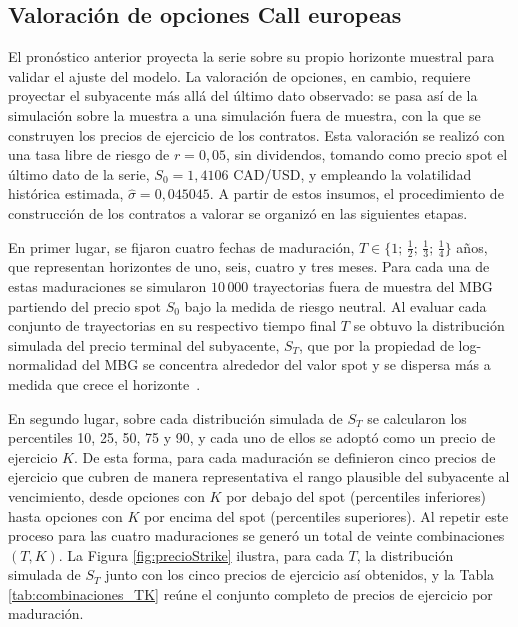 \documentclass{article}
\begin{document}
\subsection*{Valoración de opciones Call europeas}
El pronóstico anterior proyecta la serie sobre su propio horizonte muestral para validar el ajuste del modelo. La valoración de opciones, en cambio, requiere proyectar el subyacente más allá del último dato observado: se pasa así de la simulación sobre la muestra a una simulación fuera de muestra, con la que se construyen los precios de ejercicio de los contratos. Esta valoración se realizó con una tasa libre de riesgo de $r=0{,}05$, sin dividendos, tomando como precio spot el último dato de la serie, $S_0=1{,}4106$ CAD/USD, y empleando la volatilidad histórica estimada, $\widehat{\sigma}=0{,}045045$. A partir de estos insumos, el procedimiento de construcción de los contratos a valorar se organizó en las siguientes etapas.

En primer lugar, se fijaron cuatro fechas de maduración, $T\in\{1;\,\tfrac{1}{2};\,\tfrac{1}{3};\,\tfrac{1}{4}\}$ años, que representan horizontes de uno, seis, cuatro y tres meses. Para cada una de estas maduraciones se simularon $10\,000$ trayectorias fuera de muestra del MBG partiendo del precio spot $S_0$ bajo la medida de riesgo neutral. Al evaluar cada conjunto de trayectorias en su respectivo tiempo final $T$ se obtuvo la distribución simulada del precio terminal del subyacente, $S_T$, que por la propiedad de log-normalidad del MBG se concentra alrededor del valor spot y se dispersa más a medida que crece el horizonte~\cite{marin2025blackscholes}.

En segundo lugar, sobre cada distribución simulada de $S_T$ se calcularon los percentiles 10, 25, 50, 75 y 90, y cada uno de ellos se adoptó como un precio de ejercicio $K$. De esta forma, para cada maduración se definieron cinco precios de ejercicio que cubren de manera representativa el rango plausible del subyacente al vencimiento, desde opciones con $K$ por debajo del spot (percentiles inferiores) hasta opciones con $K$ por encima del spot (percentiles superiores). Al repetir este proceso para las cuatro maduraciones se generó un total de veinte combinaciones $(T,K)$. La Figura \ref{fig:precioStrike} ilustra, para cada $T$, la distribución simulada de $S_T$ junto con los cinco precios de ejercicio así obtenidos, y la Tabla \ref{tab:combinaciones_TK} reúne el conjunto completo de precios de ejercicio por maduración.
\end{document}
